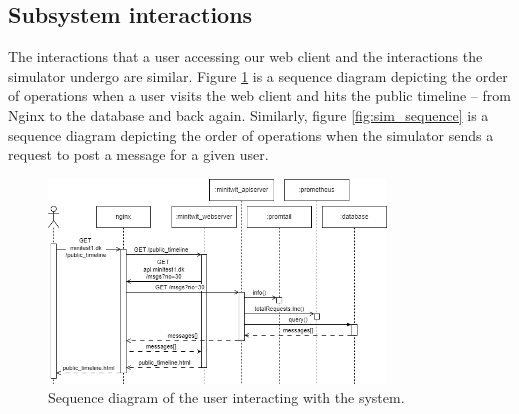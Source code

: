 

\subsection{Subsystem interactions}


The interactions that a user accessing our web client and the interactions the simulator undergo are similar. 
Figure \ref{fig:user_sequence} is a sequence diagram depicting the order of operations when a user visits the web client and hits the public timeline -- from Nginx to the database and back again. 
Similarly, figure \ref{fig:sim_sequence} is a sequence diagram depicting the order of operations when the simulator sends a request to post a message for a given user.



\begin{figure}[H]
    \centering
    \includegraphics[width=0.8\textwidth]{images/sequence.png}
    \caption{Sequence diagram of the user interacting with the system.}
    \label{fig:user_sequence}
\end{figure}

